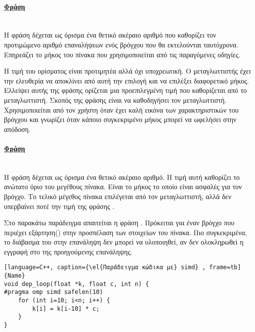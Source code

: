 \paragraph{\underline{Φράση }}
\ \\
Η φράση \emph{} δέχεται ως όρισμα ένα θετικό ακέραιο αριθμό που καθορίζει τον προτιμώμενο αριθμό επαναλήψεων
ενός βρόγχου που θα εκτελούνται ταυτόχρονα. Επηρεάζει το μήκος του πίνακα που χρησιμοποιείται από τις παραγόμενες
\emph{} οδηγίες.

Η τιμή του ορίσματος είναι προτιμητέα αλλά όχι υποχρεωτική. Ο μεταγλωττιστής έχει την ελευθερία να αποκλίνει από αυτή
την επιλογή και να επιλέξει διαφορετικό μήκος. Ελλείψει αυτής της φράσης ορίζεται μια προεπιλεγμένη τιμή που καθορίζεται
από το μεταγλωττιστή. Σκοπός της φράσης \emph{} είναι να καθοδηγήσει τον μεταγλωττιστή. Χρησιμοποιείται από
τον χρήστη όταν έχει καλή εικόνα των χαρακτηριστικών του βρόγχου και γνωρίζει όταν κάποιο συγκεκριμένο μήκος μπορεί να
ωφελήσει στην απόδοση.
\clearpage
\paragraph{\underline{Φράση }}
\mbox{}\\
Η φράση \emph{} δέχεται ως όρισμα ένα θετικό ακέραιο αριθμό. Η τιμή αυτή καθορίζει το ανώτατο όριο του
μεγέθους πίνακα. Είναι το μήκος το οποίο είναι ασφαλές για τον βρόγχο. Το τελικό μέγεθος πίνακα επιλέγεται από τον
μεταγλωττιστή, αλλά δεν υπερβαίνει ποτέ την τιμή της φράσης \emph{}.

Στο παρακάτω παράδειγμα απαιτείται η φράση \emph{}. Πρόκειται για έναν βρόγχο που περιέχει εξάρτηση() στην
προσπέλαση των στοιχείων του πίνακα. Πιο συγκεκριμένα, το διάβασμα του \emph{\en{[i-10]}} στην επανάληψη
\emph{} δεν μπορεί να υλοποιηθεί, αν δεν ολοκληρωθεί η εγγραφή στο \emph{} της προηγούμενης επανάληψης.
 

\begin{spacing}{1.3}
\begin{lstlisting}[language=C++, caption={\el{Παράδειγμα κώδικα με} simd} , frame=tb]{Name}
void dep_loop(float *k, float c, int n) {
#pragma omp simd safelen(10)
	for (int i=10; i<n; i++) {
		k[i] = k[i-10] * c;
	}
}
\end{lstlisting}
\end{spacing}

